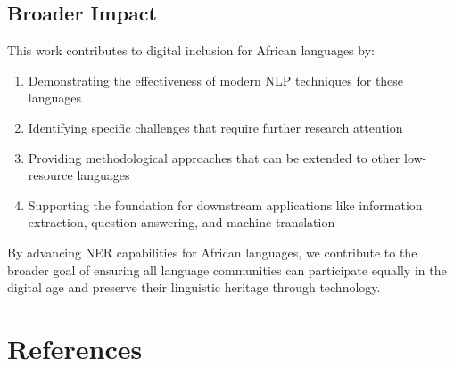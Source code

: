 \documentclass[
]{article}
\providecommand{\tightlist}{%
  \setlength{\itemsep}{0pt}\setlength{\parskip}{0pt}}\usepackage{longtable,booktabs,array}
\begin{document}
\subsection{Broader Impact}\label{broader-impact}

This work contributes to digital inclusion for African languages by:

\begin{enumerate}
\def\labelenumi{\arabic{enumi}.}
\tightlist
\item
  Demonstrating the effectiveness of modern NLP techniques for these
  languages
\item
  Identifying specific challenges that require further research
  attention
\item
  Providing methodological approaches that can be extended to other
  low-resource languages
\item
  Supporting the foundation for downstream applications like information
  extraction, question answering, and machine translation
\end{enumerate}

By advancing NER capabilities for African languages, we contribute to
the broader goal of ensuring all language communities can participate
equally in the digital age and preserve their linguistic heritage
through technology.

\section*{References}\label{references}
\end{document}

